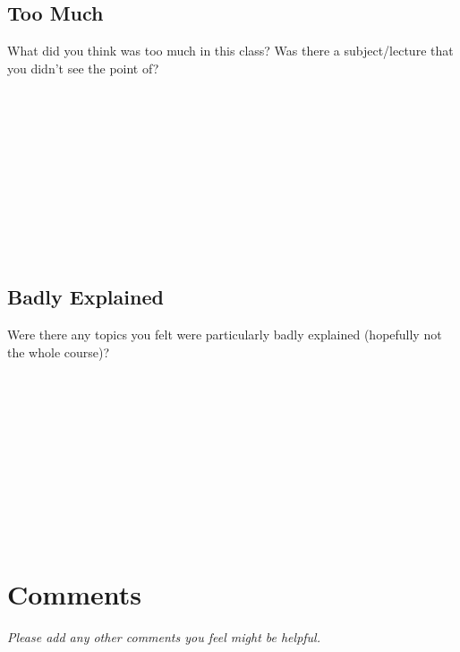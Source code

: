 \documentclass[article,twoside]{memoir}
\newcommand*{\fillunderscore}{~\hrulefill}
\newcommand{\header}[1]{\textsl{#1}}
\begin{document}
\section{Too Much}

What did you think was too much in this class? Was there a subject/lecture that you didn't see the point of?

\fillunderscore\par
\fillunderscore\par
\fillunderscore\par
\fillunderscore\par
\fillunderscore\par
\fillunderscore\par

\section{Badly Explained}

Were there any topics you felt were particularly badly explained (hopefully not the whole course)?

\fillunderscore\par
\fillunderscore\par
\fillunderscore\par
\fillunderscore\par
\fillunderscore\par
\fillunderscore\par
\chapter{Comments}

\header{Please add any other comments you feel might be helpful.}

\fillunderscore\par
\fillunderscore\par
\fillunderscore\par
\fillunderscore\par
\fillunderscore\par
\fillunderscore\par
\fillunderscore\par
\fillunderscore\par
\fillunderscore
\end{document}
